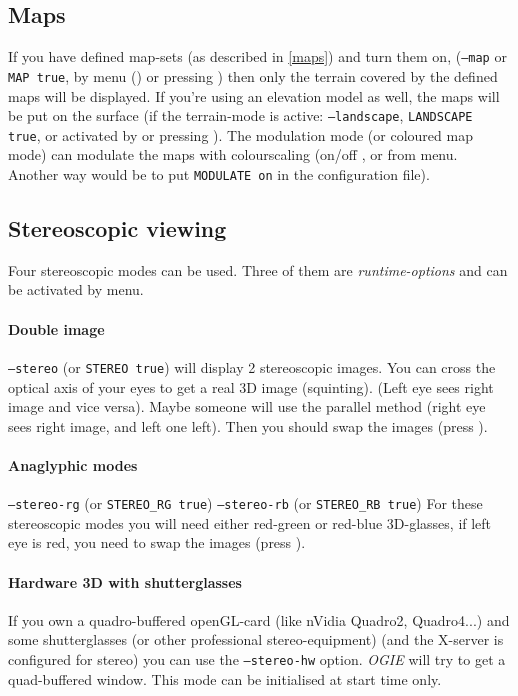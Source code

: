 \subsection{Maps}
If you have defined map-sets (as described in \ref{maps}) and turn them on,
(\texttt{--map} or \texttt{MAP true}, by menu () or pressing ) then only the terrain covered by the
defined maps will be displayed. If you're using an elevation model as well, the
maps will be put on the surface (if the terrain-mode is active: \texttt{--landscape},
\texttt{LANDSCAPE true}, or activated by  or pressing ).
The modulation mode (or coloured map mode) can modulate the maps with colourscaling (on/off , or  from menu. Another way would be to put \texttt{MODULATE on} in the configuration file).




\subsection{Stereoscopic viewing}

Four stereoscopic modes can be used.
Three of them are \emph{runtime-options} and can be activated by menu.

\paragraph{Double image}
\texttt{--stereo} (or \texttt{STEREO true})
will display 2 stereoscopic images. You can cross the optical axis of your eyes
to get a real 3D image (squinting). (Left eye sees right image and vice versa).
Maybe someone will use the parallel method (right eye sees right image, and left
one left). Then you should swap the images (press ).

\paragraph{Anaglyphic modes}
\texttt{--stereo-rg} (or \texttt{STEREO\_RG true})
\texttt{--stereo-rb} (or \texttt{STEREO\_RB true})
For these stereoscopic modes you will need either  red-green or  red-blue
3D-glasses, if left eye is red, you need to swap the images (press ).

\paragraph{Hardware 3D with shutterglasses}
If you own a  quadro-buffered openGL-card (like nVidia Quadro2, Quadro4...) and
some shutterglasses (or other professional stereo-equipment)
(and the X-server is configured for stereo) you can use the
\texttt{--stereo-hw} option. \emph{OGIE} will try to get a quad-buffered window.
This mode can be initialised at start time only.


